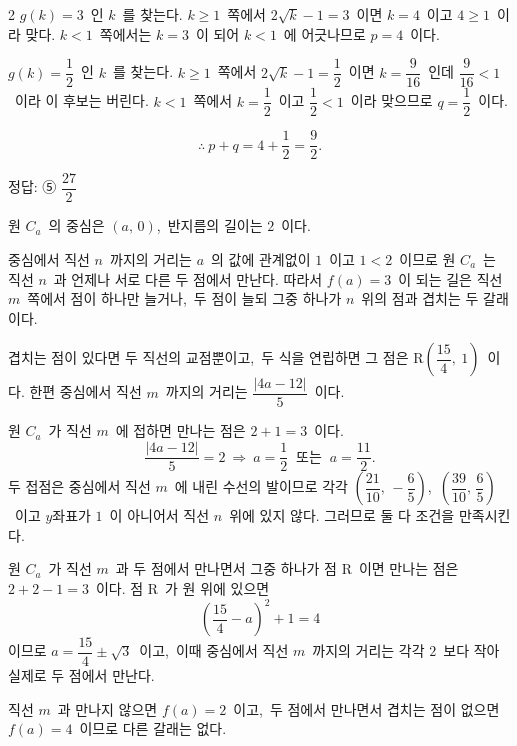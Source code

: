 \documentclass[10pt,fleqn]{article}
\begin{document}
\begin{multicols*}{2}
$g(k)=3$\ 인 $k$\ 를 찾는다. $k\ge 1$\ 쪽에서 $2\sqrt{k}-1=3$\ 이면 $k=4$\ 이고 $4\ge 1$\ 이라 맞다. $k<1$\ 쪽에서는 $k=3$\ 이 되어 $k<1$\ 에 어긋나므로 $p=4$\ 이다.

$g(k)=\dfrac12$\ 인 $k$\ 를 찾는다. $k\ge 1$\ 쪽에서 $2\sqrt{k}-1=\dfrac12$\ 이면 $k=\dfrac{9}{16}$\ 인데 $\dfrac{9}{16}<1$\ 이라 이 후보는 버린다. $k<1$\ 쪽에서 $k=\dfrac12$\ 이고 $\dfrac12<1$\ 이라 맞으므로 $q=\dfrac12$\ 이다.

$$\therefore\ p+q=4+\dfrac12=\dfrac92.$$


\begin{dmanswerbox}
정답: ⑤ $\dfrac{27}{2}$
\end{dmanswerbox}

원 $C_{a}$\ 의 중심은 $(a,\,0)$,\ 반지름의 길이는 $2$\ 이다.

중심에서 직선 $n$\ 까지의 거리는 $a$\ 의 값에 관계없이 $1$\ 이고 $1<2$\ 이므로 원 $C_{a}$\ 는 직선 $n$\ 과 언제나 서로 다른 두 점에서 만난다. 따라서 $f(a)=3$\ 이 되는 길은 직선 $m$\ 쪽에서 점이 하나만 늘거나,\ 두 점이 늘되 그중 하나가 $n$\ 위의 점과 겹치는 두 갈래이다.

겹치는 점이 있다면 두 직선의 교점뿐이고,\ 두 식을 연립하면 그 점은 $\mathrm{R}\!\left(\dfrac{15}{4},\ 1\right)$\ 이다. 한편 중심에서 직선 $m$\ 까지의 거리는 $\dfrac{|4a-12|}{5}$\ 이다.

원 $C_{a}$\ 가 직선 $m$\ 에 접하면 만나는 점은 $2+1=3$\ 이다.
$$\dfrac{|4a-12|}{5}=2\ \Longrightarrow\ a=\dfrac12\ \text{ 또는 }\ a=\dfrac{11}{2}.$$
두 접점은 중심에서 직선 $m$\ 에 내린 수선의 발이므로 각각 $\left(\dfrac{21}{10},\,-\dfrac65\right)$,\ $\left(\dfrac{39}{10},\,\dfrac65\right)$\ 이고 $y$좌표가 $1$\ 이 아니어서 직선 $n$\ 위에 있지 않다. 그러므로 둘 다 조건을 만족시킨다.

원 $C_{a}$\ 가 직선 $m$\ 과 두 점에서 만나면서 그중 하나가 점 $\mathrm{R}$\ 이면 만나는 점은 $2+2-1=3$\ 이다. 점 $\mathrm{R}$\ 가 원 위에 있으면
$$\left(\dfrac{15}{4}-a\right)^{2}+1=4$$
이므로 $a=\dfrac{15}{4}\pm\sqrt3$\ 이고,\ 이때 중심에서 직선 $m$\ 까지의 거리는 각각 $2$\ 보다 작아 실제로 두 점에서 만난다.

직선 $m$\ 과 만나지 않으면 $f(a)=2$\ 이고,\ 두 점에서 만나면서 겹치는 점이 없으면 $f(a)=4$\ 이므로 다른 갈래는 없다.


\end{multicols*}
\end{document}
